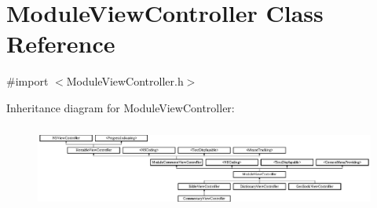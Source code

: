 \hypertarget{interface_module_view_controller}{\section{Module\-View\-Controller Class Reference}
\label{interface_module_view_controller}
}


{\ttfamily \#import $<$Module\-View\-Controller.\-h$>$}

Inheritance diagram for Module\-View\-Controller\-:\begin{figure}[H]
\begin{center}
\leavevmode
\includegraphics[height=2.800000cm]{interface_module_view_controller}
\end{center}
\end{figure}

